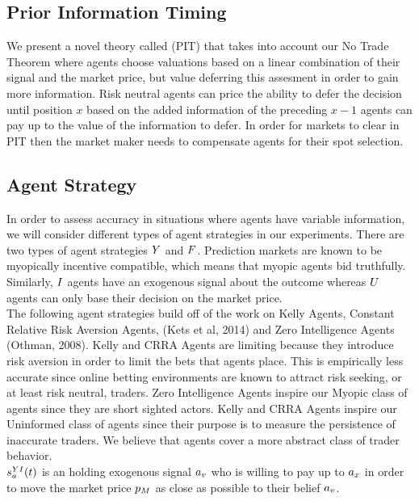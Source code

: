 \subsection{Prior Information Timing}
We present a novel theory called  (PIT) that takes into account our No Trade
Theorem where agents choose valuations based on a linear combination of their signal and the market
price, but value deferring this assesment in order to gain more information. Risk neutral agents can
price the ability to defer the decision until position $x$ based on the added information of the 
preceding $x-1$ agents can pay up to the value of the information to defer. In order for markets
to clear in PIT then the market maker needs to compensate agents for their spot selection.\\

\subsection{Agent Strategy}
In order to assess accuracy in situations where agents have variable information, we will consider different types of agent strategies in our experiments. There are two types of agent strategies  $Y$ and  $F$. Prediction markets are known to be myopically incentive compatible, which means that myopic agents bid truthfully. Similarly,  $I$ agents have an exogenous signal about the outcome whereas  $U$ agents can only base their decision on the market price. \\

The following agent strategies build off of the work on Kelly Agents, Constant Relative Risk Aversion Agents, (Kets et al, 2014) and Zero Intelligence Agents (Othman, 2008). Kelly and CRRA Agents are limiting because they introduce risk aversion in order to limit the bets that agents place. This is empirically less accurate since online betting environments are known to attract risk seeking, or at least risk neutral, traders. Zero Intelligence Agents inspire our Myopic class of agents since they are short sighted actors. Kelly and CRRA Agents inspire our Uninformed class of agents since their purpose is to measure the persistence of inaccurate traders. We believe that  agents cover a more abstract class of trader behavior.\\

$s^{YI}_a(t)$ is an  holding exogenous signal $a_v$ who is willing to pay up to $a_x$ in order to move the market price $p_M$ as close as possible to their belief $a_v$. \\

